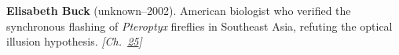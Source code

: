 \textbf{Elisabeth Buck} (unknown–2002). American biologist who verified the synchronous flashing of \emph{Pteroptyx} fireflies in Southeast Asia, refuting the optical illusion hypothesis. \emph{[Ch.~\hyperref[ch:fireflybioluminescence]{25}]}

